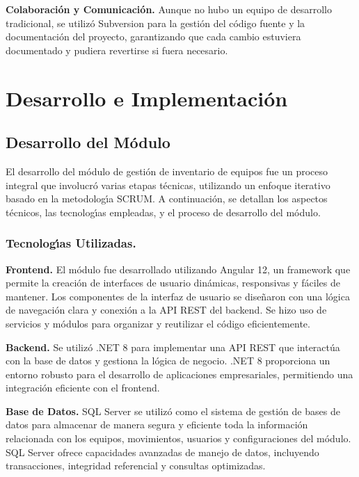 \documentclass[stu, 12pt, letterpaper, donotrepeattitle, floatsintext, natbib]{apa7}
\begin{document}
\textbf{Colaboraci\'on y Comunicaci\'on. }Aunque no hubo un equipo de desarrollo tradicional, se utiliz\'o Subversion para la gesti\'on del c\'odigo fuente y la documentaci\'on del proyecto, garantizando que cada cambio estuviera documentado y pudiera revertirse si fuera necesario.
\newpage
\section{Desarrollo e Implementaci\'on}
\subsection{Desarrollo del M\'odulo}
El desarrollo del m\'odulo de gesti\'on de inventario de equipos fue un proceso integral que involucr\'o varias etapas t\'ecnicas, utilizando un enfoque iterativo basado en la metodolog\'{\i}a SCRUM. A continuaci\'on, se detallan los aspectos t\'ecnicos, las tecnolog\'{\i}as empleadas, y el proceso de desarrollo del m\'odulo.
\subsubsection{Tecnolog\'{\i}as Utilizadas.}
\textbf{Frontend. }El m\'odulo fue desarrollado utilizando Angular 12, un framework que permite la creaci\'on de interfaces de usuario din\'amicas, responsivas y f\'aciles de mantener. Los componentes de la interfaz de usuario se dise\~{n}aron con una l\'ogica de navegaci\'on clara y conexi\'on a la API REST del backend. Se hizo uso de servicios y m\'odulos para organizar y reutilizar el c\'odigo eficientemente.

\textbf{Backend. }Se utiliz\'o .NET 8 para implementar una API REST que interact\'ua con la base de datos y gestiona la l\'ogica de negocio. .NET 8 proporciona un entorno robusto para el desarrollo de aplicaciones empresariales, permitiendo una integraci\'on eficiente con el frontend.

\textbf{Base de Datos. }SQL Server se utiliz\'o como el sistema de gesti\'on de bases de datos para almacenar de manera segura y eficiente toda la informaci\'on relacionada con los equipos, movimientos, usuarios y configuraciones del m\'odulo. SQL Server ofrece capacidades avanzadas de manejo de datos, incluyendo transacciones, integridad referencial y consultas optimizadas.
\end{document}
